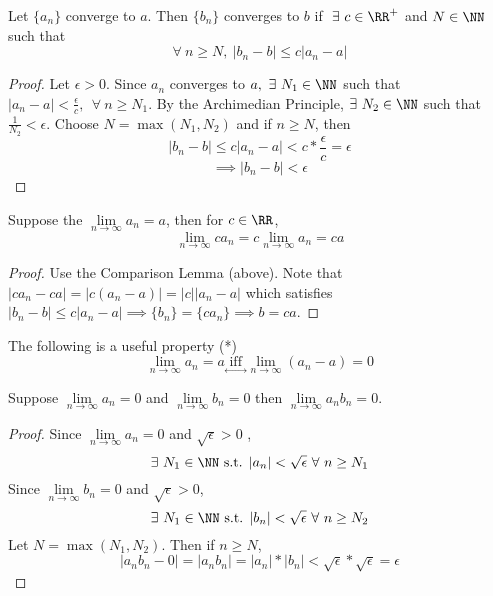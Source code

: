 \documentclass[12pt]{scrartcl}
\begin{document}
\begin{lemma}
  
  \hfill

  Let $\{a_n\}$ converge to $a$. Then $\{b_n\}$ converges to $b$ if $\ \exists \ c \in \RR^+$
  and $N \in \NN$ such that
  \[\forall \ n \geq N, \ |b_n - b| \leq c|a_n - a|\]
  \begin{proof}
    Let $\epsilon > 0$. Since $a_n$ converges to $a, \ \exists \ N_1 \in \NN$ such that 
    $|a_n - a| < \frac{\epsilon}{c}, \ \ \forall \ n \geq N_1$. By the Archimedian Principle,
    $\exists \ N_2 \in \NN$ such that $\frac{1}{N_2} < \epsilon$. Choose $N = \max(N_1, N_2)$
    and if $n \geq N$, then 
    \[|b_n - b| \leq c |a_n - a| < c * \frac{\epsilon}{c} = \epsilon\]
    \[\implies |b_n - b| < \epsilon\]
  \end{proof}
\end{lemma}

\begin{lemma}
  Suppose the $\underset{n\to\infty}{\lim} a_n = a$, then for $c \in \RR$, 
  \[\lim_{n\to\infty}ca_n = c\lim_{n\to\infty}a_n = ca\]

  \begin{proof}
    Use the Comparison Lemma (above). Note that $|ca_n - ca| = |c(a_n-a)| = |c||a_n - a|$ 
    which satisfies $|b_n - b| \leq c|a_n - a| \implies \{b_n\} = \{ca_n\} \implies b = ca$.
  \end{proof}
\end{lemma}

\begin{lemma}
  The following is a useful property (*)
  \[\lim_{n\to\infty}a_n = a \underset{\leftrightarrow}{\text{ iff }} \lim_{n\to\infty}(a_n - a) = 0\]

\end{lemma}

\begin{lemma}
  Suppose $\underset{n\to\infty}{\lim} a_n =0$ and $\underset{n\to\infty}{\lim}b_n = 0$ 
  then $\underset{n\to\infty}{\lim}a_n b_n = 0$.
  \begin{proof}
    Since $\underset{n\to\infty}{\lim} a_n = 0$ and $\sqrt{\epsilon} > 0$ ,
    \[\exists \ N_1 \in \NN \text{ s.t. } |a_n| < \sqrt{\epsilon} \ \forall \ n \geq N_1\]
    Since $\underset{n\to\infty}{\lim}b_n = 0$ and $\sqrt{\epsilon} > 0$, 
    \[\exists \ N_1 \in \NN \text{ s.t. } |b_n| < \sqrt{\epsilon} \ \forall \ n \geq N_2\]
    Let $N = \max(N_1, N_2)$. Then if $n\geq N$,
    \[|a_nb_n - 0| = |a_n b_n| = |a_n| * |b_n| < \sqrt{\epsilon} * \sqrt{\epsilon} = \epsilon\]
  \end{proof}
\end{lemma}
\end{document}
